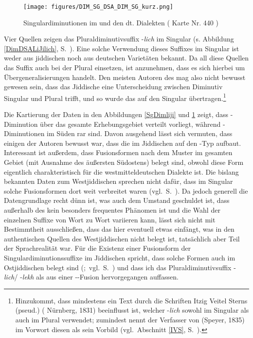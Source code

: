 \begin{figure} 

\texttt{[image: figures/DIM\_SG\_DSA\_DIM\_SG\_kurz.png]}
		\caption{\label{SgDimDSAliji} Singulardiminutionen im  und den dt. Dialekten ( Karte Nr. 440 ) }
		\end{figure}
 
Vier Quellen zeigen das Pluraldiminutivsuffix -\textit{lich} im Singular (s. Abbildung \ref{DimDSALiJilich}, S.\, \pageref{DimDSALiJilich}). Eine solche Verwendung dieses Suffixes im Singular ist weder aus jiddischen noch aus deutschen Varietäten bekannt. Da all diese Quellen das Suffix auch  bei der  Plural einsetzen, ist anzunehmen, dass es sich hierbei um Übergeneralisierungen handelt.\label{lichHyper} Den meisten Autoren des  mag also nicht bewusst gewesen sein, dass das Jiddische eine Unterscheidung zwischen Diminutiv Singular und Plural trifft, und so wurde das   auf den Singular übertragen.\footnote{Hinzukommt, dass mindestens ein Text durch die Schriften Itzig Veitel Sterns (pseud.) (  Nürnberg, 1831) beeinflusst ist, welcher -\textit{lich} sowohl im Singular als auch im Plural verwendet; zumindest nennt der Verfasser von  (Speyer, 1835) im Vorwort diesen als sein Vorbild (vgl.\, Abschnitt \ref{IVS}, S.\, \pageref{IVS}).} 
 
Die Kartierung der Daten in den Abbildungen \ref{SgDimliji} und \ref{SgDimDSAliji} zeigt, dass -{Di\-mi\-nu\-tion} über das gesamte Erhebungsgebiet verteilt vorliegt, während -Di\-mi\-nu\-tio\-nen im Süden rar sind. Davon ausgehend lässt sich vermuten, dass einigen der Autoren bewusst war, dass die  im Jiddischen auf den -Typ aufbaut. Interessant ist außerdem, dass Fusionsformen nach dem Muster  im gesamten Gebiet (mit Ausnahme des äußersten Südostens) belegt sind, 
\largerpage[-1]
obwohl diese Form eigentlich charakteristisch für die westmitteldeutschen Dialekte ist. Die bislang bekannten Daten zum Westjiddischen sprechen nicht dafür, dass im Singular solche Fusionsformen dort weit verbreitet waren (vgl.\, S.\, \pageref{DIMSGWJ}). Da jedoch generell die Datengrundlage recht dünn ist, was auch dem Umstand geschuldet ist, dass  außerhalb des \hai{{\LiJi}} kein besonders frequentes Phänomen ist und die Wahl der einzelnen Suffixe von Wort zu Wort variieren kann, lässt sich nicht mit Bestimmtheit ausschließen, dass das  hier eventuell etwas einfängt, was in den authentischen Quellen des Westjiddischen nicht belegt ist, tatsächlich aber Teil der Sprachrealität war. Für die Existenz einer Fusionsform der Singulardiminutionssuffixe im Jiddischen spricht, dass solche Formen auch im Ostjiddischen belegt sind (\citealt[122, Karten Nr. 36S1, 36S2]{Herzog2000};\,%
vgl.\, S.\, \pageref{SOJDIM}) und dass ich das Pluraldiminutivsuffix -\textit{lich}/ -\textit{lekh} als aus einer --Fusion hervorgegangen auffassen.



